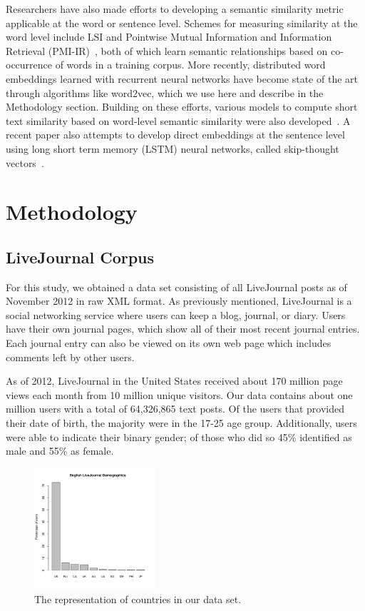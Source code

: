 \documentclass{sigchi}
\begin{document}
Researchers have also made efforts to developing a semantic similarity metric applicable at the word or sentence level. Schemes for measuring similarity at the word level include LSI and Pointwise Mutual Information and Information Retrieval (PMI-IR)~\cite{turney2001}, both of which learn semantic relationships based on co-occurrence of words in a training corpus. More recently, distributed word embeddings learned with recurrent neural networks have become state of the art through algorithms like word2vec, which we use here and describe in the Methodology section. Building on these efforts, various models to compute short text similarity  based on  word-level semantic similarity were also developed~\cite{mihalcea2006,kenter15short}. A recent paper also attempts to develop direct embeddings at the sentence level using long short term memory (LSTM) neural networks, called skip-thought vectors~\cite{kiros2015skip}. 

\section{Methodology}

\subsection{LiveJournal Corpus}
For this study, we obtained a data set consisting of all LiveJournal posts as of November 2012 in raw XML format. As previously mentioned, LiveJournal is a social networking service where users can keep a blog, journal, or diary. Users have their own journal pages, which show all of their most recent journal entries. Each journal entry can also be viewed on its own web page which includes comments left by other users. 

As of 2012, LiveJournal in the United States received about 170 million page views each month from 10 million unique visitors. Our data contains about one million users with a total of 64,326,865 text posts. Of the users that provided their date of birth, the majority were in the 17-25 age group. Additionally, users were able to indicate their binary gender; of those who did so 45\% identified as male and 55\% as female. 

\begin{figure}[tb]
\centering \includegraphics[width=0.4\textwidth]{figures/demographics} 
\caption{The representation of countries in our data set. }
\end{figure}
\end{document}
